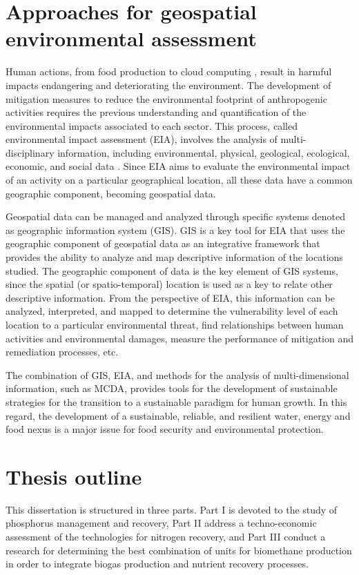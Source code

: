\begin{refsection}[referencesCh1]
\section{Approaches for geospatial environmental assessment}
Human actions, from food production\citep{foster2007environmental} to cloud computing \citep{di2017can}, result in harmful impacts endangering and deteriorating the environment. The development of mitigation measures to reduce the environmental footprint of anthropogenic activities requires the previous understanding and quantification of the environmental impacts associated to each sector. This process, called environmental impact assessment (EIA), involves the analysis of multi-disciplinary information, including environmental, physical, geological, ecological, economic, and social data \citep{gharehbaghi2018gis}. Since EIA aims to evaluate the environmental impact of an activity on a particular geographical location, all these data have a common geographic component, becoming geospatial data.

Geospatial data can be managed and analyzed through specific systems denoted as geographic information system (GIS). GIS is a key tool for EIA that uses the geographic component of geospatial data as an integrative framework that provides the ability to analyze and map descriptive information of the locations studied. The geographic component of data is the key element of GIS systems, since the spatial (or spatio-temporal) location is used as a key to relate other descriptive information. From the perspective of EIA, this information can be analyzed, interpreted, and mapped to determine the vulnerability level of each location to a particular environmental threat, find relationships between human activities and environmental damages, measure the performance of mitigation and remediation processes, etc.

The combination of GIS, EIA, and methods for the analysis of multi-dimensional information, such as MCDA, provides tools for the development of sustainable strategies for the transition to a sustainable paradigm for human growth. In this regard, the development of a sustainable, reliable, and resilient water, energy and food nexus is a major issue for food security and environmental protection.

\section{Thesis outline}
This dissertation is structured in three parts. Part I is devoted to the study of phosphorus management and recovery, Part II address a techno-economic assessment of the technologies for nitrogen recovery, and Part III conduct a research for determining the best combination of units for biomethane production in order to integrate biogas production and nutrient recovery processes.


\end{refsection}
